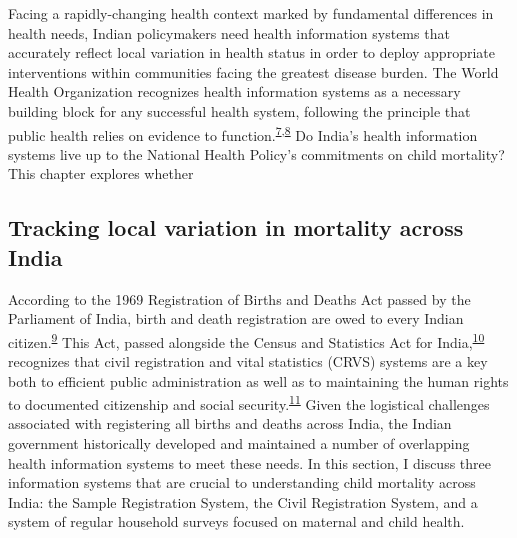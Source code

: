 \documentclass[
]{article}
\begin{document}
Facing a rapidly-changing health context marked by fundamental differences in health needs, Indian policymakers need health information systems that accurately reflect local variation in health status in order to deploy appropriate interventions within communities facing the greatest disease burden. The World Health Organization recognizes health information systems as a necessary building block for any successful health system, following the principle that public health relies on evidence to function.\textsuperscript{\protect\hyperlink{ref-WorldHealthOrganization2010}{7},\protect\hyperlink{ref-Abouzahr2005}{8}} Do India's health information systems live up to the National Health Policy's commitments on child mortality? This chapter explores whether

\hypertarget{tracking-local-variation-in-mortality-across-india}{%
\subsection{Tracking local variation in mortality across India}\label{tracking-local-variation-in-mortality-across-india}}

According to the 1969 Registration of Births and Deaths Act passed by the Parliament of India, birth and death registration are owed to every Indian citizen.\textsuperscript{\protect\hyperlink{ref-ParliamentoftheRepublicofIndia1969}{9}} This Act, passed alongside the Census and Statistics Act for India,\textsuperscript{\protect\hyperlink{ref-Subramanian1969}{10}} recognizes that civil registration and vital statistics (CRVS) systems are a key both to efficient public administration as well as to maintaining the human rights to documented citizenship and social security.\textsuperscript{\protect\hyperlink{ref-srs}{11}} Given the logistical challenges associated with registering all births and deaths across India, the Indian government historically developed and maintained a number of overlapping health information systems to meet these needs. In this section, I discuss three information systems that are crucial to understanding child mortality across India: the Sample Registration System, the Civil Registration System, and a system of regular household surveys focused on maternal and child health.
\end{document}
